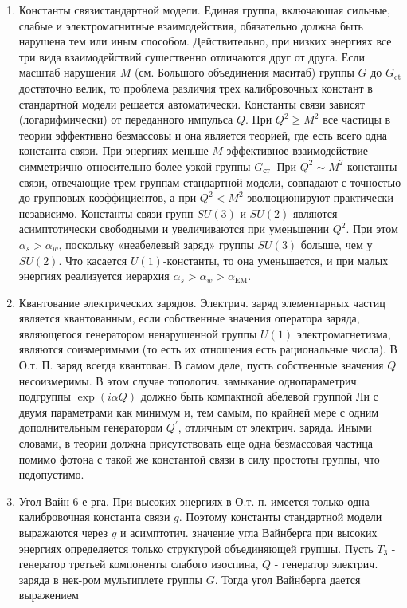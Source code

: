 \documentclass[10pt]{article}
\begin{document}
\begin{enumerate}

  \item Константы связистандартной модели. Единая группа, включаюшая сильные, слабые и электромагнитные взаимодействия, обязательно должна быть нарушена тем или иным способом. Действительно, при низких энергиях все три вида взаимодействий сушественно отличаются друг от друга. Если масштаб нарушения $M$ (см. Большого объединения маситаб) группы $G$ до $G_{\mathrm{ct}}$ достаточно велик, то проблема различия трех калибровочных констант в стандартной модели решается автоматически. Константы связи зависят (логарифмически) от переданного импульса $Q$. При $Q^{2} \geqslant M^{2}$ все частицы в теории эффективно безмассовы и она является теорией, где есть всего одна константа связи. При энергиях меньше $M$ эффективное взаимодействие симметрично относительно более узкой группы $G_{\text {ст }}$ При $Q^{2} \sim M^{2}$ константы связи, отвечающие трем группам стандартной модели, совпадают с точностью до групповых коэффициентов, а при $Q^{2}<M^{2}$ эволюционируют практически независимо. Константы связи групп $S U(3)$ и $S U(2)$ являются асимптотически свободными и увеличиваются при уменьшении $Q^{2}$. При этом $\alpha_{s}>\alpha_{w}$, поскольку «неабелевый заряд» группы $S U(3)$ болыше, чем у $S U(2)$. Что касается $U(1)$-константы, то она уменьшается, и при малых энергиях реализуется иерархия $\alpha_{s}>\alpha_{w}>\alpha_{\mathrm{EM}}$.



  \item Квантование электрических зарядов. Электрич. заряд элементарных частиц является квантованным, если собственные значения оператора заряда, являющегося генератором ненарушенной группы $U(1)$ электромагнетизма, являются соизмеримыми (то есть их отношения есть рациональные числа). В О.т. П. заряд всегда квантован. В самом деле, пусть собственные значения $Q$ несоизмеримы. В этом случае топологич. замыкание однопараметрич. подгруппы $\exp (i \alpha Q)$ должно быть компактной абелевой группой Ли с двумя параметрами как минимум и, тем самым, по крайней мере с одним дополнительным генератором $Q^{\prime}$, отличным от электрич. заряда. Иными словами, в теории должна присутствовать еще одна безмассовая частица помимо фотона с такой же константой связи в силу простоты группы, что недопустимо.



  \item Угол Вайн 6 е рга. При высоких энергиях в О.т. п. имеется только одна калибровочная константа связи $g$. Поэтому константы стандартной модели выражаются через $g$ и асимптотич. значение угла Вайнберга при высоких энергиях определяется только структурой объединяющей групшы. Пусть $T_{3}$ - генератор третьей компоненты слабого изоспина, $Q$ - генератор электрич. заряда в нек-ром мультиплете группы $G$. Тогда угол Вайнберга дается выражением



\end{enumerate}
\end{document}

